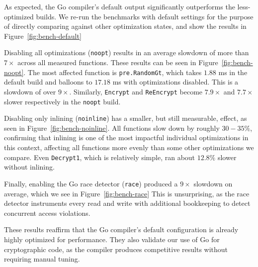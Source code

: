 As expected, the Go compiler’s default output significantly outperforms the less-optimized builds.
We re-run the benchmarks with default settings for the purpose of directly comparing against other optimization states, and show the results in Figure~\ref{fig:bench-default}

Disabling all optimizations (\texttt{noopt}) results in an average slowdown of more than $7\times$ across all measured functions.
These results can be seen in Figure~\ref{fig:bench-noopt}.
The most affected function is \texttt{pre.RandomGt}, which takes $1.88$ ms in the default build and balloons to $17.18$ ms with optimizations disabled. 
This is a slowdown of over $9\times$.
Similarly, \texttt{Encrypt} and \texttt{ReEncrypt} become $7.9\times$ and $7.7\times$ slower respectively in the \texttt{noopt} build.

Disabling only inlining (\texttt{noinline}) has a smaller, but still measurable, effect, as seen in Figure~\ref{fig:bench-noinline}.
All functions slow down by roughly $30-35\%$, confirming that inlining is one of the most impactful individual optimizations in this context, affecting all functions more evenly than some other optimizations we compare.
Even \texttt{Decrypt1}, which is relatively simple, ran about $12.8\%$ slower without inlining.

Finally, enabling the Go race detector (\texttt{race}) produced a $9\times$ slowdown on average, which we see in Figure~\ref{fig:bench-race}
This is unsurprising, as the race detector instruments every read and write with additional bookkeeping to detect concurrent access violations.

These results reaffirm that the Go compiler’s default configuration is already highly optimized for performance.
They also validate our use of Go for cryptographic code, as the compiler produces competitive results without requiring manual tuning.

